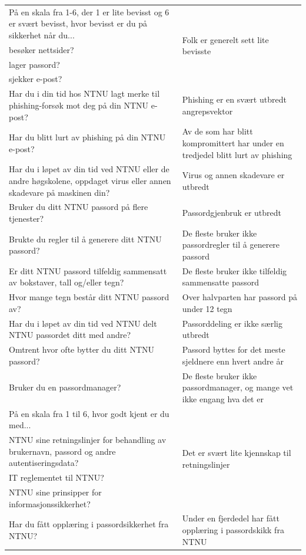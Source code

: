 \begin{table}[H]
\begin{tabular}{|p{20.215em}|p{20.57em}|}
    \hline
    På en skala fra 1-6, der 1 er lite bevisst og 6 er svært bevisst, hvor bevisst er du på sikkerhet når du... & \multirow{4}[2]{*}{Folk er generelt sett lite bevisste} \\
    besøker nettsider? & \multicolumn{1}{r|}{} \\
    lager passord? & \multicolumn{1}{r|}{} \\
    sjekker e-post? & \multicolumn{1}{r|}{} \\
    \hline
    Har du i din tid hos NTNU lagt merke til phishing-forsøk mot deg på din NTNU e-post? & Phishing er en svært utbredt angrepsvektor \\
    \hline
    Har du blitt lurt av phishing på din NTNU e-post? & Av de som har blitt kompromittert har under en tredjedel blitt lurt av phishing \\
    \hline
    Har du i løpet av din tid ved NTNU eller de andre høgskolene, oppdaget virus eller annen skadevare på maskinen din? & Virus og annen skadevare er utbredt \\
    \hline
    Bruker du ditt NTNU passord på flere tjenester? & Passordgjenbruk er utbredt \\
    \hline
    Brukte du regler til å generere ditt NTNU passord? & De fleste bruker ikke passordregler til å generere passord \\
    \hline
    Er ditt NTNU passord tilfeldig sammensatt av bokstaver, tall og/eller tegn? & De fleste bruker ikke tilfeldig sammensatte passord \\
    \hline
    Hvor mange tegn består ditt NTNU passord av? & Over halvparten har passord på under 12 tegn \\
    \hline
    Har du i løpet av din tid ved NTNU delt NTNU passordet ditt med andre? & Passorddeling er ikke særlig utbredt \\
    \hline
    Omtrent hvor ofte bytter du ditt NTNU passord? & Passord byttes for det meste sjeldnere enn hvert andre år \\
    \hline
    Bruker du en passordmanager? & De fleste bruker ikke passordmanager, og mange vet ikke engang hva det er \\
    \hline
    På en skala fra 1 til 6, hvor godt kjent er du med... & \multirow{4}[2]{*}{Det er svært lite kjennskap til retningslinjer} \\
    NTNU sine retningslinjer for behandling av brukernavn, passord og andre autentiseringsdata? & \multicolumn{1}{r|}{} \\
    IT reglementet til NTNU? & \multicolumn{1}{r|}{} \\
    NTNU sine prinsipper for informasjonssikkerhet? & \multicolumn{1}{r|}{} \\
    \hline
    Har du fått opplæring i passordsikkerhet fra NTNU? & Under en fjerdedel har fått opplæring i passordskikk fra NTNU \\
    \hline
    \end{tabular}%
  \label{tab:hypoteser}%
\end{table}%

